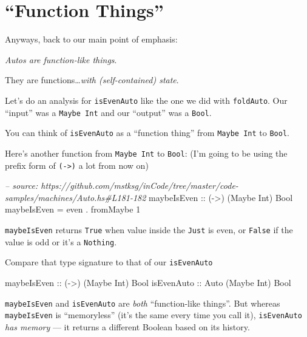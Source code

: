 \documentclass[]{article}
\newenvironment{Shaded}{\begin{snugshade}}{\end{snugshade}}
\newcommand{\CommentTok}[1]{\textcolor[rgb]{0.56,0.35,0.01}{\textit{#1}}}
\newcommand{\DataTypeTok}[1]{\textcolor[rgb]{0.13,0.29,0.53}{#1}}
\newcommand{\DecValTok}[1]{\textcolor[rgb]{0.00,0.00,0.81}{#1}}
\newcommand{\FunctionTok}[1]{\textcolor[rgb]{0.00,0.00,0.00}{#1}}
\newcommand{\NormalTok}[1]{#1}
\newcommand{\OtherTok}[1]{\textcolor[rgb]{0.56,0.35,0.01}{#1}}
\begin{document}
\hypertarget{function-things}{%
\section{``Function Things''}\label{function-things}}

Anyways, back to our main point of emphasis:

\emph{Autos are function-like things}.

They are functions\ldots{}\emph{with (self-contained) state}.

Let's do an analysis for \texttt{isEvenAuto} like the one we did with
\texttt{foldAuto}. Our ``input'' was a \texttt{Maybe\ Int} and our ``output''
was a \texttt{Bool}.

You can think of \texttt{isEvenAuto} as a ``function thing'' from
\texttt{Maybe\ Int} to \texttt{Bool}.

Here's another function from \texttt{Maybe\ Int} to \texttt{Bool}: (I'm going to
be using the prefix form of \texttt{(-\textgreater{})} a lot from now on)

\begin{Shaded}
\begin{Highlighting}[]
\CommentTok{-- source: https://github.com/mstksg/inCode/tree/master/code-samples/machines/Auto.hs#L181-182}
\OtherTok{maybeIsEven ::}\NormalTok{ (}\OtherTok{->}\NormalTok{) (}\DataTypeTok{Maybe} \DataTypeTok{Int}\NormalTok{) }\DataTypeTok{Bool}
\NormalTok{maybeIsEven }\FunctionTok{=}\NormalTok{ even }\FunctionTok{.}\NormalTok{ fromMaybe }\DecValTok{1}
\end{Highlighting}
\end{Shaded}

\texttt{maybeIsEven} returns \texttt{True} when value inside the \texttt{Just}
is even, or \texttt{False} if the value is odd or it's a \texttt{Nothing}.

Compare that type signature to that of our \texttt{isEvenAuto}

\begin{Shaded}
\begin{Highlighting}[]
\OtherTok{maybeIsEven ::}\NormalTok{ (}\OtherTok{->}\NormalTok{) (}\DataTypeTok{Maybe} \DataTypeTok{Int}\NormalTok{) }\DataTypeTok{Bool}
\OtherTok{isEvenAuto  ::} \DataTypeTok{Auto}\NormalTok{ (}\DataTypeTok{Maybe} \DataTypeTok{Int}\NormalTok{) }\DataTypeTok{Bool}
\end{Highlighting}
\end{Shaded}

\texttt{maybeIsEven} and \texttt{isEvenAuto} are \emph{both} ``function-like
things''. But whereas \texttt{maybeIsEven} is ``memoryless'' (it's the same
every time you call it), \texttt{isEvenAuto} \emph{has memory} --- it returns a
different Boolean based on its history.
\end{document}

